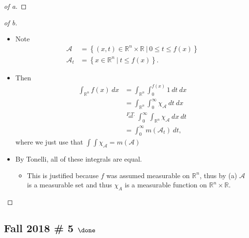 \begin{solution}
\begin{proof}[of a]
\end{proof}

\begin{proof}[of b]

\envlist

\begin{itemize}
\item
  Note
  \begin{align*}
  \mathcal{A} &= \left\{{(x, t) \in {\mathbb{R}}^n\times{\mathbb{R}}{~\mathrel{\Big|}~}0 \leq t \leq f(x)}\right\} 
  \\
  \mathcal{A}_t &= \left\{{x
  \in {\mathbb{R}}^n {~\mathrel{\Big|}~}t\leq f(x) }\right\}
  .\end{align*}
\item
  Then
  \begin{align*}
  \int_{{\mathbb{R}}^n} f(x) ~dx 
  &= \int_{{\mathbb{R}}^n} \int_0^{f(x)} 1 ~dt~dx \\
  &= \int_{{\mathbb{R}}^n} \int_{0}^\infty \chi_\mathcal{A} ~dt~dx \\
  &\overset{F.T.}= \int_{0}^\infty \int_{{\mathbb{R}}^n} \chi_\mathcal{A} ~dx~dt\\
  &= \int_0^\infty m(\mathcal{A}_t) ~dt
  ,\end{align*}
  where we just use that \(\int \int \chi_\mathcal{A} = m(\mathcal{A})\)
\item
  By Tonelli, all of these integrals are equal.

  \begin{itemize}
  \tightlist
  \item
    This is justified because \(f\) was assumed measurable on
    \({\mathbb{R}}^n\), thus by (a) \(\mathcal{A}\) is a measurable set
    and thus \(\chi_A\) is a measurable function on
    \({\mathbb{R}}^n\times{\mathbb{R}}\).
  \end{itemize}
\end{itemize}

\end{proof}

\end{solution}

\hypertarget{fall-2018-5-done}{%
\subsection{\texorpdfstring{Fall 2018 \# 5
\(\done\)}{Fall 2018 \# 5 \textbackslash done}}\label{fall-2018-5-done}}

